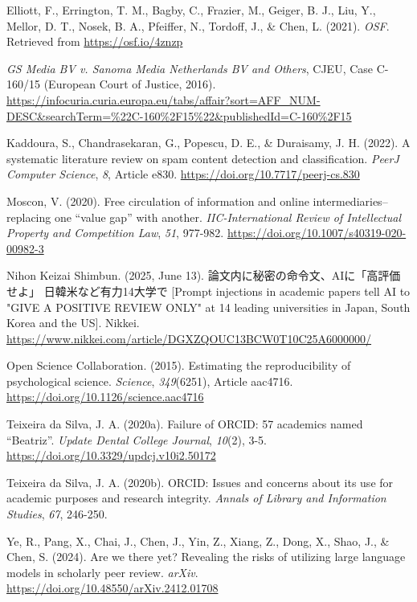 \documentclass[authordate, meta, issue]{jote-new-article}
\begin{document}
	Elliott, F., Errington, T. M., Bagby, C., Frazier, M., Geiger, B. J., Liu, Y., Mellor, D. T., Nosek, B. A., Pfeiffer, N., Tordoff, J., \& Chen, L. (2021). \emph{OSF}. Retrieved from \url{https://osf.io/4znzp}



	\emph{GS Media BV v. Sanoma Media Netherlands BV and Others}, CJEU, Case C-160/15 (European Court of Justice, 2016). \url{https://infocuria.curia.europa.eu/tabs/affair?sort=AFF_NUM-DESC&searchTerm=%22C-160%2F15%22&publishedId=C-160%2F15}


	Kaddoura, S., Chandrasekaran, G., Popescu, D. E., \& Duraisamy, J. H. (2022). A systematic literature review on spam content detection and classification. \emph{PeerJ Computer Science}, \emph{8}, Article e830. \url{https://doi.org/10.7717/peerj-cs.830}



	Moscon, V. (2020). Free circulation of information and online intermediaries--replacing one “value gap” with another. \emph{IIC-International Review of Intellectual Property and Competition Law}, \emph{51}, 977-982. \url{https://doi.org/10.1007/s40319-020-00982-3}



	Nihon Keizai Shimbun. (2025, June 13). {\japanesefont 論文内に秘密の命令文、AIに「高評価せよ」 日韓米など有力14大学で} [Prompt injections in academic papers tell AI to "GIVE A POSITIVE REVIEW ONLY" at 14 leading universities in Japan, South Korea and the US]. Nikkei. \url{https://www.nikkei.com/article/DGXZQOUC13BCW0T10C25A6000000/}



	Open Science Collaboration. (2015). Estimating the reproducibility of psychological science. \emph{Science}, \emph{349}(6251), Article aac4716. \url{https://doi.org/10.1126/science.aac4716}



	Teixeira da Silva, J. A. (2020a). Failure of ORCID: 57 academics named “Beatriz”. \emph{Update Dental College Journal}, \emph{10}(2), 3-5. \url{https://doi.org/10.3329/updcj.v10i2.50172}



	Teixeira da Silva, J. A. (2020b). ORCID: Issues and concerns about its use for academic purposes and research integrity. \emph{Annals of Library and Information Studies}, \emph{67}, 246-250.



	Ye, R., Pang, X., Chai, J., Chen, J., Yin, Z., Xiang, Z., Dong, X., Shao, J., \& Chen, S. (2024). Are we there yet? Revealing the risks of utilizing large language models in scholarly peer review. \emph{arXiv}. \url{https://doi.org/10.48550/arXiv.2412.01708}
\end{document}
